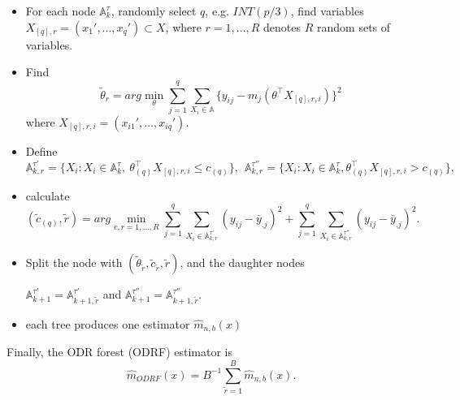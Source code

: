 \documentclass[nojss]{jss}
\numberwithin{equation}{section}
\begin{document}
\begin{itemize}

  \item For each node $\mathbb{A}_k^\tau$, randomly select $q$, e.g. $INT(p/3)$, find variables $  X_{[q], r} = (x_1', ..., x_q') \subset X $, where $ r = 1, ..., R $ denotes $R$ random sets of variables.

  \item Find $$ \tilde \theta_{r} = arg \min_{\theta} \sum_{j=1}^q \sum_{X_i \in \mathbb{A}} \{y_{ij} - m_j(\theta^\top X_{[q],r, i})\}^2  $$
  where $ X_{[q],r, i} = (x_{i1}', ..., x_{iq}') $.
\item Define
  $$
    \mathbb{A}_{k,r}^{\tau'} = \{ X_i: X_i \in \mathbb{A}_k^\tau, \  \theta_{(q)}^\top X_{[q],r, i} \le c_{(q)}\}, \ \
    \mathbb{A}_{k,r}^{\tau''} = \{ X_i: X_i \in \mathbb{A}_k^\tau, \theta_{(q)}^\top X_{[q],r, i} > c_{(q)}\},
  $$
 \item  calculate
   $$
     (\tilde c_{(q)}, \tilde r) =arg  \min_{ c, r=1,..., R} \sum_{j=1}^q \sum_{X_i \in \mathbb{A}_{k,r}^{\tau'}} (y_{ij} - \bar y_{.j})^2  + \sum_{j=1}^q \sum_{X_i \in \mathbb{A}_{k, r}^{\tau''}} (y_{ij} - \bar y_{.j})^2.
   $$
 \item Split the node with $ (\tilde \theta_{\tilde r}, \tilde c_{\tilde r}, \tilde r) $, and the daughter nodes
\begin{center}
 $\mathbb{A}_{k+1}^{\tau'} = \mathbb{A}_{k+1,\tilde r}^{\tau'}$ and $\mathbb{A}_{k+1}^{\tau''} = \mathbb{A}_{k+1,\tilde r}^{\tau''}$.
\end{center}


  \item each tree produces one estimator $ \hat m_{n, b} (x) $

\end{itemize}
Finally, the ODR forest (ODRF) estimator is
  $$
    \hat m_{ODRF}(x) = B^{-1} \sum_{\tilde r=1}^B \hat m_{n, b} (x).
  $$


\end{document}
